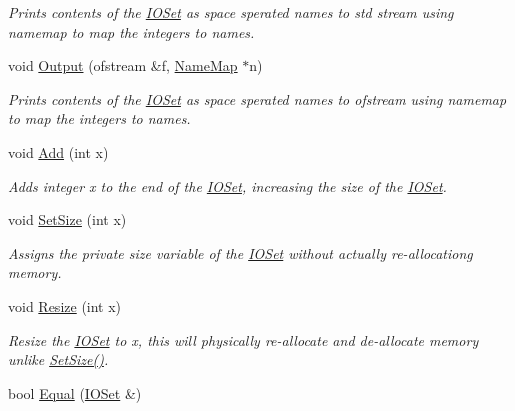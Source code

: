 \begin{DoxyCompactItemize}
\begin{DoxyCompactList}\small\item\em Prints contents of the \hyperlink{class_i_o_set}{IOSet} as space sperated names to std stream using namemap to map the integers to names. \item\end{DoxyCompactList}\item 
\hypertarget{class_i_o_set_a7c47a724e56e8502f8b0225c471d8592}{
void \hyperlink{class_i_o_set_a7c47a724e56e8502f8b0225c471d8592}{Output} (ofstream \&f, \hyperlink{class_name_map}{NameMap} $\ast$n)}
\label{class_i_o_set_a7c47a724e56e8502f8b0225c471d8592}

\begin{DoxyCompactList}\small\item\em Prints contents of the \hyperlink{class_i_o_set}{IOSet} as space sperated names to ofstream using namemap to map the integers to names. \item\end{DoxyCompactList}\item 
\hypertarget{class_i_o_set_ae9b008481e0f283e6c6d4ed99b91dc0e}{
void \hyperlink{class_i_o_set_ae9b008481e0f283e6c6d4ed99b91dc0e}{Add} (int x)}
\label{class_i_o_set_ae9b008481e0f283e6c6d4ed99b91dc0e}

\begin{DoxyCompactList}\small\item\em Adds integer x to the end of the \hyperlink{class_i_o_set}{IOSet}, increasing the size of the \hyperlink{class_i_o_set}{IOSet}. \item\end{DoxyCompactList}\item 
void \hyperlink{class_i_o_set_a45a883dcdfae7eafbc303039727bdf49}{SetSize} (int x)
\begin{DoxyCompactList}\small\item\em Assigns the private size variable of the \hyperlink{class_i_o_set}{IOSet} without actually re-\/allocationg memory. \item\end{DoxyCompactList}\item 
\hypertarget{class_i_o_set_a31b2d68680061f676892b70954b55102}{
void \hyperlink{class_i_o_set_a31b2d68680061f676892b70954b55102}{Resize} (int x)}
\label{class_i_o_set_a31b2d68680061f676892b70954b55102}

\begin{DoxyCompactList}\small\item\em Resize the \hyperlink{class_i_o_set}{IOSet} to x, this will physically re-\/allocate and de-\/allocate memory unlike \hyperlink{class_i_o_set_a45a883dcdfae7eafbc303039727bdf49}{SetSize()}. \item\end{DoxyCompactList}\item 
\hypertarget{class_i_o_set_adf73ea0bebbddbb1136d26fc9f6dddba}{
bool \hyperlink{class_i_o_set_adf73ea0bebbddbb1136d26fc9f6dddba}{Equal} (\hyperlink{class_i_o_set}{IOSet} \&)}
\label{class_i_o_set_adf73ea0bebbddbb1136d26fc9f6dddba}


\end{DoxyCompactItemize}
